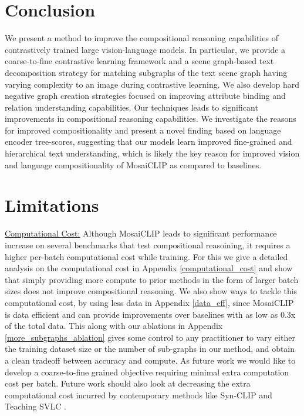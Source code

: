 \documentclass[11pt]{article}
\newcommand{\methodcomp}{MosaiCLIP}
\begin{document}
\section{Conclusion}
\label{sec_conclusion}
We present a method to improve the compositional reasoning capabilities of contrastively trained large vision-language models. In particular, we provide a coarse-to-fine contrastive learning framework and a scene graph-based text decomposition strategy for matching subgraphs of the text scene graph having varying complexity to an image during contrastive learning. We also develop hard negative graph creation strategies focused on improving attribute binding and relation understanding capabilities. Our techniques leads to significant improvements in compositional reasoning capabilities. We investigate the reasons for improved compositionality and present a novel finding based on language encoder tree-scores, suggesting that our models learn improved fine-grained and hierarchical text understanding, which is likely the key reason for improved vision and language compositionality of \methodcomp{} as compared to baselines. \section{Limitations}
\label{sec_limitations}
\underline{Computational Cost:} Although \methodcomp{} leads to significant performance increase on several benchmarks that test compositional reasoining, it requires a higher per-batch computational cost while training. For this we give a detailed analysis on the computational cost in Appendix \ref{computational_cost} and show that simply providing more compute to prior methods in the form of larger batch sizes does not improve compositional reasoning. We also show ways to tackle this computational cost, by using less data in Appendix \ref{data_eff}, since \methodcomp{} is data efficient and can provide improvements over baselines with as low as 0.3x of the total data. This along with our ablations in Appendix \ref{more_subgraphs_ablation} gives some control to any practitioner to vary either the training dataset size or the number of sub-graphs in our method, and obtain a clean tradeoff between accuracy and compute. As future work we would like to develop a coarse-to-fine grained objective requiring minimal extra computation cost per batch. Future work should also look at decreasing the extra computational cost incurred by contemporary methods like Syn-CLIP \citep{cascantebonilla2023going} and Teaching SVLC \citep{doveh2023teaching}.\\
\end{document}
